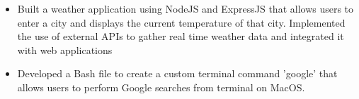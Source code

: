 \documentclass[10pt,a4paper,ragged2e,withhyper]{altacv}
\begin{document}
\begin{paracol}{2}
\divider


\begin{itemize}
    \item Built a weather application using NodeJS and ExpressJS that allows users to enter a city and displays the current temperature of that city. Implemented the use of external APIs to gather real time weather data and integrated it with web applications
\end{itemize}

\divider


\begin{itemize}
    \item Developed a Bash file to create a custom terminal command 'google' that allows users to perform Google searches from terminal on MacOS.

\end{itemize}
\medskip








\end{paracol}
\end{document}
